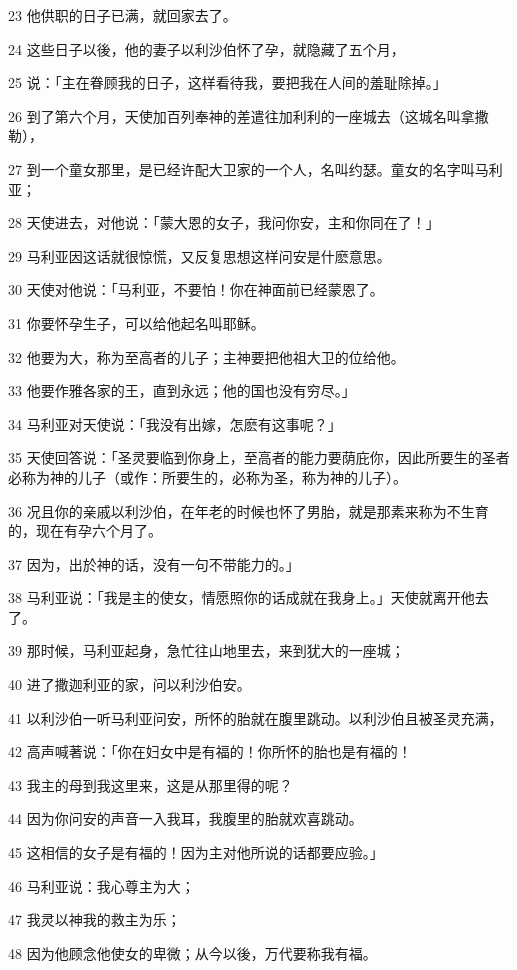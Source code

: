 \par 23 他供职的日子已满，就回家去了。
\par 24 这些日子以後，他的妻子以利沙伯怀了孕，就隐藏了五个月，
\par 25 说：「主在眷顾我的日子，这样看待我，要把我在人间的羞耻除掉。」
\par 26 到了第六个月，天使加百列奉神的差遣往加利利的一座城去（这城名叫拿撒勒），
\par 27 到一个童女那里，是已经许配大卫家的一个人，名叫约瑟。童女的名字叫马利亚；
\par 28 天使进去，对他说：「蒙大恩的女子，我问你安，主和你同在了！」
\par 29 马利亚因这话就很惊慌，又反复思想这样问安是什麽意思。
\par 30 天使对他说：「马利亚，不要怕！你在神面前已经蒙恩了。
\par 31 你要怀孕生子，可以给他起名叫耶稣。
\par 32 他要为大，称为至高者的儿子；主神要把他祖大卫的位给他。
\par 33 他要作雅各家的王，直到永远；他的国也没有穷尽。」
\par 34 马利亚对天使说：「我没有出嫁，怎麽有这事呢？」
\par 35 天使回答说：「圣灵要临到你身上，至高者的能力要荫庇你，因此所要生的圣者必称为神的儿子（或作：所要生的，必称为圣，称为神的儿子）。
\par 36 况且你的亲戚以利沙伯，在年老的时候也怀了男胎，就是那素来称为不生育的，现在有孕六个月了。
\par 37 因为，出於神的话，没有一句不带能力的。」
\par 38 马利亚说：「我是主的使女，情愿照你的话成就在我身上。」天使就离开他去了。
\par 39 那时候，马利亚起身，急忙往山地里去，来到犹大的一座城；
\par 40 进了撒迦利亚的家，问以利沙伯安。
\par 41 以利沙伯一听马利亚问安，所怀的胎就在腹里跳动。以利沙伯且被圣灵充满，
\par 42 高声喊著说：「你在妇女中是有福的！你所怀的胎也是有福的！
\par 43 我主的母到我这里来，这是从那里得的呢？
\par 44 因为你问安的声音一入我耳，我腹里的胎就欢喜跳动。
\par 45 这相信的女子是有福的！因为主对他所说的话都要应验。」
\par 46 马利亚说：我心尊主为大；
\par 47 我灵以神我的救主为乐；
\par 48 因为他顾念他使女的卑微；从今以後，万代要称我有福。
